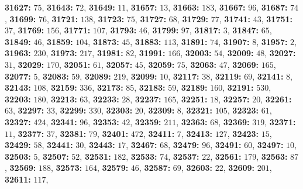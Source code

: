 \textsf{\bfseries 31627:} $75$, \textsf{\bfseries 31643:} $72$, \textsf{\bfseries 31649:} $11$, \textsf{\bfseries 31657:} $13$, \textsf{\bfseries 31663:} $183$, \textsf{\bfseries 31667:} $96$, \textsf{\bfseries 31687:} $74$, \textsf{\bfseries 31699:} $76$, \textsf{\bfseries 31721:} $138$, \textsf{\bfseries 31723:} $75$, \textsf{\bfseries 31727:} $68$, \textsf{\bfseries 31729:} $77$, \textsf{\bfseries 31741:} $43$, \textsf{\bfseries 31751:} $37$, \textsf{\bfseries 31769:} $156$, \textsf{\bfseries 31771:} $107$, \textsf{\bfseries 31793:} $46$, \textsf{\bfseries 31799:} $97$, \textsf{\bfseries 31817:} $3$, \textsf{\bfseries 31847:} $65$, \textsf{\bfseries 31849:} $46$, \textsf{\bfseries 31859:} $104$, \textsf{\bfseries 31873:} $45$, \textsf{\bfseries 31883:} $113$, \textsf{\bfseries 31891:} $74$, \textsf{\bfseries 31907:} $8$, \textsf{\bfseries 31957:} $2$, \textsf{\bfseries 31963:} $230$, \textsf{\bfseries 31973:} $217$, \textsf{\bfseries 31981:} $82$, \textsf{\bfseries 31991:} $166$, \textsf{\bfseries 32003:} $54$, \textsf{\bfseries 32009:} $48$, \textsf{\bfseries 32027:} $31$, \textsf{\bfseries 32029:} $170$, \textsf{\bfseries 32051:} $61$, \textsf{\bfseries 32057:} $45$, \textsf{\bfseries 32059:} $75$, \textsf{\bfseries 32063:} $47$, \textsf{\bfseries 32069:} $165$, \textsf{\bfseries 32077:} $5$, \textsf{\bfseries 32083:} $59$, \textsf{\bfseries 32089:} $219$, \textsf{\bfseries 32099:} $10$, \textsf{\bfseries 32117:} $38$, \textsf{\bfseries 32119:} $69$, \textsf{\bfseries 32141:} $8$, \textsf{\bfseries 32143:} $108$, \textsf{\bfseries 32159:} $336$, \textsf{\bfseries 32173:} $85$, \textsf{\bfseries 32183:} $59$, \textsf{\bfseries 32189:} $160$, \textsf{\bfseries 32191:} $530$, \textsf{\bfseries 32203:} $180$, \textsf{\bfseries 32213:} $63$, \textsf{\bfseries 32233:} $28$, \textsf{\bfseries 32237:} $165$, \textsf{\bfseries 32251:} $18$, \textsf{\bfseries 32257:} $20$, \textsf{\bfseries 32261:} $63$, \textsf{\bfseries 32297:} $33$, \textsf{\bfseries 32299:} $330$, \textsf{\bfseries 32303:} $20$, \textsf{\bfseries 32309:} $8$, \textsf{\bfseries 32321:} $105$, \textsf{\bfseries 32323:} $61$, \textsf{\bfseries 32327:} $424$, \textsf{\bfseries 32341:} $96$, \textsf{\bfseries 32353:} $42$, \textsf{\bfseries 32359:} $211$, \textsf{\bfseries 32363:} $68$, \textsf{\bfseries 32369:} $319$, \textsf{\bfseries 32371:} $11$, \textsf{\bfseries 32377:} $37$, \textsf{\bfseries 32381:} $79$, \textsf{\bfseries 32401:} $472$, \textsf{\bfseries 32411:} $7$, \textsf{\bfseries 32413:} $127$, \textsf{\bfseries 32423:} $15$, \textsf{\bfseries 32429:} $58$, \textsf{\bfseries 32441:} $30$, \textsf{\bfseries 32443:} $17$, \textsf{\bfseries 32467:} $68$, \textsf{\bfseries 32479:} $96$, \textsf{\bfseries 32491:} $60$, \textsf{\bfseries 32497:} $10$, \textsf{\bfseries 32503:} $5$, \textsf{\bfseries 32507:} $52$, \textsf{\bfseries 32531:} $182$, \textsf{\bfseries 32533:} $74$, \textsf{\bfseries 32537:} $22$, \textsf{\bfseries 32561:} $179$, \textsf{\bfseries 32563:} $87$, \textsf{\bfseries 32569:} $188$, \textsf{\bfseries 32573:} $164$, \textsf{\bfseries 32579:} $46$, \textsf{\bfseries 32587:} $69$, \textsf{\bfseries 32603:} $22$, \textsf{\bfseries 32609:} $201$, \textsf{\bfseries 32611:} $117$, 
